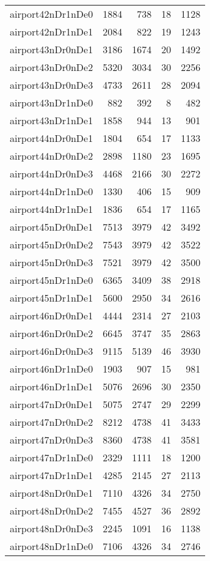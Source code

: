 \documentclass[../../../thesis.tex]{subfiles}
\begin{document}
\begin{longtable}{lrrrr}
airport42nDr1nDe0 & 1884 & 738 & 18 & 1128 \\
airport42nDr1nDe1 & 2084 & 822 & 19 & 1243 \\
airport43nDr0nDe1 & 3186 & 1674 & 20 & 1492 \\
airport43nDr0nDe2 & 5320 & 3034 & 30 & 2256 \\
airport43nDr0nDe3 & 4733 & 2611 & 28 & 2094 \\
airport43nDr1nDe0 & 882 & 392 & 8 & 482 \\
airport43nDr1nDe1 & 1858 & 944 & 13 & 901 \\
airport44nDr0nDe1 & 1804 & 654 & 17 & 1133 \\
airport44nDr0nDe2 & 2898 & 1180 & 23 & 1695 \\
airport44nDr0nDe3 & 4468 & 2166 & 30 & 2272 \\
airport44nDr1nDe0 & 1330 & 406 & 15 & 909 \\
airport44nDr1nDe1 & 1836 & 654 & 17 & 1165 \\
airport45nDr0nDe1 & 7513 & 3979 & 42 & 3492 \\
airport45nDr0nDe2 & 7543 & 3979 & 42 & 3522 \\
airport45nDr0nDe3 & 7521 & 3979 & 42 & 3500 \\
airport45nDr1nDe0 & 6365 & 3409 & 38 & 2918 \\
airport45nDr1nDe1 & 5600 & 2950 & 34 & 2616 \\
airport46nDr0nDe1 & 4444 & 2314 & 27 & 2103 \\
airport46nDr0nDe2 & 6645 & 3747 & 35 & 2863 \\
airport46nDr0nDe3 & 9115 & 5139 & 46 & 3930 \\
airport46nDr1nDe0 & 1903 & 907 & 15 & 981 \\
airport46nDr1nDe1 & 5076 & 2696 & 30 & 2350 \\
airport47nDr0nDe1 & 5075 & 2747 & 29 & 2299 \\
airport47nDr0nDe2 & 8212 & 4738 & 41 & 3433 \\
airport47nDr0nDe3 & 8360 & 4738 & 41 & 3581 \\
airport47nDr1nDe0 & 2329 & 1111 & 18 & 1200 \\
airport47nDr1nDe1 & 4285 & 2145 & 27 & 2113 \\
airport48nDr0nDe1 & 7110 & 4326 & 34 & 2750 \\
airport48nDr0nDe2 & 7455 & 4527 & 36 & 2892 \\
airport48nDr0nDe3 & 2245 & 1091 & 16 & 1138 \\
airport48nDr1nDe0 & 7106 & 4326 & 34 & 2746 \\

\end{longtable}
\end{document}
